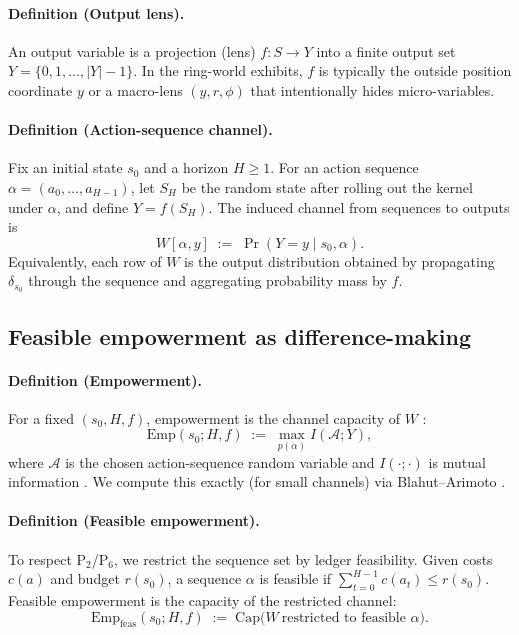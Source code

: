 \documentclass[11pt]{article}
\newcommand{\Emp}{\mathrm{Emp}}
\newcommand{\Alpha}{\mathcal{A}}
\begin{document}
\paragraph{Definition (Output lens).}
An output variable is a projection (lens) $f:S\to Y$ into a finite output set $Y=\{0,1,\dots,|Y|-1\}$. In the ring-world exhibits, $f$ is typically the outside position coordinate $y$ or a macro-lens $(y,r,\phi)$ that intentionally hides micro-variables.

\paragraph{Definition (Action-sequence channel).}
Fix an initial state $s_0$ and a horizon $H\ge 1$. For an action sequence $\alpha=(a_0,\dots,a_{H-1})$, let $S_H$ be the random state after rolling out the kernel under $\alpha$, and define $Y=f(S_H)$. The induced channel from sequences to outputs is
\[
W[\alpha, y] \;:=\; \Pr(Y=y \mid s_0,\alpha).
\]
Equivalently, each row of $W$ is the output distribution obtained by propagating $\delta_{s_0}$ through the sequence and aggregating probability mass by $f$.

\subsection{Feasible empowerment as difference-making}
\paragraph{Definition (Empowerment).}
For a fixed $(s_0,H,f)$, empowerment is the channel capacity of $W$ \citep{klyubin2005,shannon1948}:
\[
\Emp(s_0;H,f) \;:=\; \max_{p(\alpha)} I(\Alpha;Y),
\]
where $\Alpha$ is the chosen action-sequence random variable and $I(\cdot;\cdot)$ is mutual information \citep{shannon1948}. We compute this exactly (for small channels) via Blahut--Arimoto \citep{blahut1972,arimoto1972}.

\paragraph{Definition (Feasible empowerment).}
To respect P$_2$/P$_6$, we restrict the sequence set by ledger feasibility. Given costs $c(a)$ and budget $r(s_0)$, a sequence $\alpha$ is feasible if $\sum_{t=0}^{H-1} c(a_t) \le r(s_0)$. Feasible empowerment is the capacity of the restricted channel:
\[
\Emp_{\mathrm{feas}}(s_0;H,f) \;:=\; \mathrm{Cap}\bigl(W\ \text{restricted to feasible }\alpha\bigr).
\]
\end{document}
